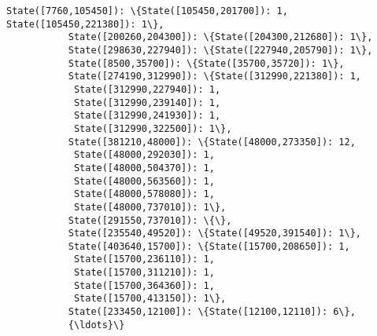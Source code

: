 \documentclass[11pt]{article}
\begin{document}
\begin{Verbatim}[commandchars=\\\{\}]
           State([7760,105450]): \{State([105450,201700]): 1, State([105450,221380]): 1\},
           State([200260,204300]): \{State([204300,212680]): 1\},
           State([298630,227940]): \{State([227940,205790]): 1\},
           State([8500,35700]): \{State([35700,35720]): 1\},
           State([274190,312990]): \{State([312990,221380]): 1,
            State([312990,227940]): 1,
            State([312990,239140]): 1,
            State([312990,241930]): 1,
            State([312990,322500]): 1\},
           State([381210,48000]): \{State([48000,273350]): 12,
            State([48000,292030]): 1,
            State([48000,504370]): 1,
            State([48000,563560]): 1,
            State([48000,578080]): 1,
            State([48000,737010]): 1\},
           State([291550,737010]): \{\},
           State([235540,49520]): \{State([49520,391540]): 1\},
           State([403640,15700]): \{State([15700,208650]): 1,
            State([15700,236110]): 1,
            State([15700,311210]): 1,
            State([15700,364360]): 1,
            State([15700,413150]): 1\},
           State([233450,12100]): \{State([12100,12110]): 6\},
           {\ldots}\}
\end{Verbatim}
            
\end{document}
